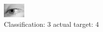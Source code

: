 \begin{figure}[h!]
\begin{center}
\includegraphics[width=0.60\columnwidth]{figures/ID2882_class_3_target_4.png}
\end{center}
\caption{ Classification: 3 actual target: 4}
\label{fig:ID2882_class_3_target_4}
\end{figure}
